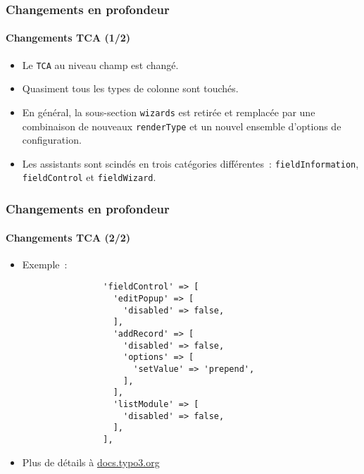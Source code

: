 \begin{frame}[fragile]
	\frametitle{Changements en profondeur}
	\framesubtitle{Changements TCA (1/2)}

	\begin{itemize}

		\item Le \texttt{TCA} au niveau champ est changé.

		\item Quasiment tous les types de colonne sont touchés.

		\item En général, la sous-section \texttt{wizards} est retirée et remplacée
			par une combinaison de nouveaux \texttt{renderType} et un nouvel ensemble
			d'options de configuration.

		\item Les assistants sont scindés en trois catégories différentes~:
			\texttt{fieldInformation}, \texttt{fieldControl} et \texttt{fieldWizard}.

	\end{itemize}

\end{frame}

\begin{frame}[fragile]
	\frametitle{Changements en profondeur}
	\framesubtitle{Changements TCA (2/2)}

	\lstset{basicstyle=\tiny\ttfamily}

	\begin{itemize}
		\item Exemple~:

			\begin{lstlisting}
				'fieldControl' => [
				  'editPopup' => [
				    'disabled' => false,
				  ],
				  'addRecord' => [
				    'disabled' => false,
				    'options' => [
				      'setValue' => 'prepend',
				    ],
				  ],
				  'listModule' => [
				    'disabled' => false,
				  ],
				],
			\end{lstlisting}

		\item Plus de détails à
			\href{https://docs.typo3.org/typo3cms/extensions/core/8-dev/singlehtml/Index.html#deprecation-79440-formengine-element-expansion}{docs.typo3.org}

	\end{itemize}

\end{frame}


